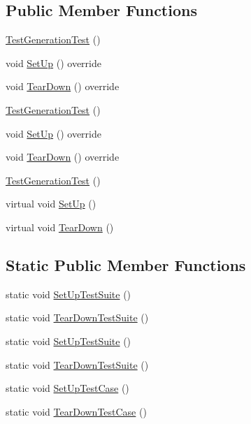 \subsection*{Public Member Functions}
\begin{DoxyCompactItemize}
\item 
\mbox{\hyperlink{class_test_generation_test_ad243bf217fa672ce25675b8bd86e285e}{Test\+Generation\+Test}} ()
\item 
void \mbox{\hyperlink{class_test_generation_test_a06cbce86435733a568824f9641ea57c2}{Set\+Up}} () override
\item 
void \mbox{\hyperlink{class_test_generation_test_a7e6a732f786fe5b2d989c11c51eb9fe1}{Tear\+Down}} () override
\item 
\mbox{\hyperlink{class_test_generation_test_ad243bf217fa672ce25675b8bd86e285e}{Test\+Generation\+Test}} ()
\item 
void \mbox{\hyperlink{class_test_generation_test_a06cbce86435733a568824f9641ea57c2}{Set\+Up}} () override
\item 
void \mbox{\hyperlink{class_test_generation_test_a7e6a732f786fe5b2d989c11c51eb9fe1}{Tear\+Down}} () override
\item 
\mbox{\hyperlink{class_test_generation_test_ad243bf217fa672ce25675b8bd86e285e}{Test\+Generation\+Test}} ()
\item 
virtual void \mbox{\hyperlink{class_test_generation_test_a9705d633439b360b338503599a360ea8}{Set\+Up}} ()
\item 
virtual void \mbox{\hyperlink{class_test_generation_test_a447190a74b306b4b94c25fed474d6029}{Tear\+Down}} ()
\end{DoxyCompactItemize}
\subsection*{Static Public Member Functions}
\begin{DoxyCompactItemize}
\item 
static void \mbox{\hyperlink{class_test_generation_test_a079d02b490a5c802ae9a650dd43293ba}{Set\+Up\+Test\+Suite}} ()
\item 
static void \mbox{\hyperlink{class_test_generation_test_ac365207087edbdfaa00aeb0f3549a351}{Tear\+Down\+Test\+Suite}} ()
\item 
static void \mbox{\hyperlink{class_test_generation_test_a079d02b490a5c802ae9a650dd43293ba}{Set\+Up\+Test\+Suite}} ()
\item 
static void \mbox{\hyperlink{class_test_generation_test_ac365207087edbdfaa00aeb0f3549a351}{Tear\+Down\+Test\+Suite}} ()
\item 
static void \mbox{\hyperlink{class_test_generation_test_a3e1681e93e14b17fe923e763d88940cb}{Set\+Up\+Test\+Case}} ()
\item 
static void \mbox{\hyperlink{class_test_generation_test_ab0f077f3b881d66e3676741761222732}{Tear\+Down\+Test\+Case}} ()
\end{DoxyCompactItemize}
